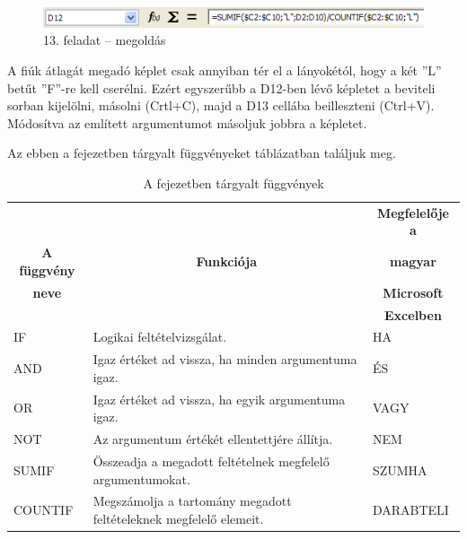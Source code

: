 \begin{figure}[!h]
\begin{center}
\includegraphics[width=12.28cm]{oocalcv1-img76.png}
\caption{13.  feladat -- megoldás}\label{13-feladatMegoldás}
\end{center}
\end{figure}

A fiúk átlagát megadó képlet csak annyiban tér el a
lányokétól, hogy a két
''L'' betűt
''F''-re kell cserélni. Ezért
egyszerűbb a D12-ben lévő képletet a beviteli sorban
kijelölni, másolni (Crtl+C), majd a D13 cellába beilleszteni
(Ctrl+V). Módosítva az említett argumentumot másoljuk jobbra a
képletet.

Az ebben a fejezetben tárgyalt függvényeket 
táblázatban találjuk meg.


\begin{table}[!h]
\begin{center}
\caption{A fejezetben tárgyalt függvények}\label{7-fejezetFüggvények}
\begin{tabular}{|m{2.5cm}|m{8cm}|m{3cm}|}
\hline
 & & \multicolumn{1}{c|}{\textbf{Megfelelője a}} \\
\multicolumn{1}{|c|}{\textbf{A függvény}}&
\multicolumn{1}{c|}{\textbf{Funkciója}}&
\multicolumn{1}{c|}{\textbf{magyar}} \\
\multicolumn{1}{|c|}{\textbf{neve}} & &
\multicolumn{1}{c|}{\textbf{Microsoft}} \\
 & & \multicolumn{1}{c|}{\textbf{Excelben}} \\
\hline
IF & Logikai feltételvizsgálat. & HA\\ \hline
AND & Igaz értéket ad vissza, ha minden argumentuma igaz. & ÉS\\ \hline
OR & Igaz értéket ad vissza, ha egyik argumentuma igaz. & VAGY\\ \hline
NOT & Az argumentum értékét ellentettjére állítja. & NEM\\ \hline
SUMIF & Összeadja a megadott feltételnek megfelelő
argumentumokat. & SZUMHA\\ \hline
COUNTIF & Megszámolja a tartomány megadott feltételeknek
megfelelő elemeit. & DARABTELI\\ \hline
\end{tabular}
\end{center}
\end{table}

